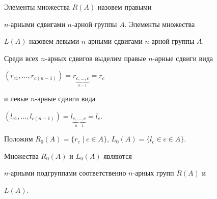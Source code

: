 \begin{defnnonum}


Элементы множества $R(A)$ назовем правыми


$n$-арными сдвигами $n$-арной группы $A$. Элементы множества


$L(A)$ назовем левыми $n$-арными сдвигами $n$-арной группы $A$.


\end{defnnonum}





Среди всех $n$-арных сдвигов выделим правые $n$-арные сдвиги вида


$(r_{c1},\dotsc,r_{c(n-1)}){=}


r_{\underbrace{\scriptstyle{c,\dotsc,c}}_{n-1}}{=}r_c$


и левые $n$-арные сдвиги вида


$(l_{c1},\dotsc,l_{c(n-1)})=


l_{\underbrace{\scriptstyle{c,\dotsc,c}}_{n-1}}=l_c.$


Положим $R_0(A)=\{r_c\mid c\in A\}$, $L_0(A) = \{l_c\in c\in A\}$.





\begin{prop}


Множества $R_0(A)$ и $L_0(A)$ являются


$n$-арными подгруппами соответственно $n$-арных групп $R(A)$ и


$L(A)$.


\end{prop}





